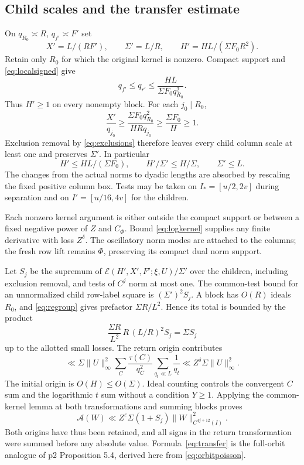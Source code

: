 \documentclass[11pt,a4paper]{article}
\numberwithin{equation}{section}
\theoremstyle{definition}
\theoremstyle{remark}
\newcommand{\eps}{\varepsilon}
\newcommand{\E}{\mathcal E}
\begin{document}
\subsection{Child scales and the transfer estimate}\label{sec:children}
On $q_{R_0}\asymp R$, $q_{f'}\asymp F'$ set
\begin{equation}\label{eq:children}
 X'=L/(RF'),\qquad \Sigma'=L/R,\qquad
 H'=HL/(\Sigma F_0R^2).
\end{equation}
Retain only $R_0$ for which the original kernel is nonzero. Compact support and \eqref{eq:localsigned} give
\[
 q_{f'}\le q_{r'}\le\frac{HL}{\Sigma F_0q_{R_0}^2}.
\]
Thus $H'\ge1$ on every nonempty block. For each $j_0\mid R_0$,
\[
 \frac{X'}{q_{j_0}}
 \ge\frac{\Sigma F_0q_{R_0}^2}{HRq_{j_0}}
 \ge\frac{\Sigma F_0}{H}\ge1.
\]
Exclusion removal by \eqref{eq:exclusions} therefore leaves every child column scale at least one and preserves $\Sigma'$. In particular
\begin{equation}\label{eq:childineq}
 H'\le HL/(\Sigma F_0),\qquad
 H'/\Sigma'\le H/\Sigma,\qquad \Sigma'\le L.
\end{equation}
The changes from the actual norms to dyadic lengths are absorbed by rescaling the fixed positive column box. Tests may be taken on $I_*=[u/2,2v]$ during separation and on $I'=[u/16,4v]$ for the children.

Each nonzero kernel argument is either outside the compact support or between a fixed negative power of $Z$ and $C_\Phi$. Bound \eqref{eq:logkernel} supplies any finite derivative with loss $Z^\delta$. The oscillatory norm modes are attached to the columns; the fresh row lift remains $\Phi$, preserving its compact dual norm support.

Let $S_j$ be the supremum of
$\E(H',X',F';\xi,U)/\Sigma'$
over the children, including exclusion removal, and tests of $C^j$ norm at most one. The common-test bound for an unnormalized child row-label square is $(\Sigma')^2S_j$. A block has $O(R)$ ideals $R_0$, and \eqref{eq:regroup} gives prefactor $\Sigma R/L^2$. Hence its total is bounded by the product
\[
 \frac{\Sigma R}{L^2}\,R\,(L/R)^2S_j=\Sigma S_j
\]
up to the allotted small losses. The return origin contributes
\[
 \ll\Sigma\|U\|_\infty^2
     \sum_C\frac{\tau(C)}{q_C^2}
     \sum_{q_t\ll L}\frac1{q_t}
 \ll Z^\delta\Sigma\|U\|_\infty^2.
\]
The initial origin is $O(H)\le O(\Sigma)$. Ideal counting controls the convergent $C$ sum and the logarithmic $t$ sum without a condition $Y\ge1$. Applying the common-kernel lemma at both transformations and summing blocks proves
\begin{equation}\label{eq:transfer}
 \mathcal A(W)\ll Z^\eps\Sigma(1+S_j)
                               \|W\|_{C^{4j+12}(I)}^2.
\end{equation}
Both origins have thus been retained, and all signs in the return transformation were summed before any absolute value. Formula~\eqref{eq:transfer} is the full-orbit analogue of p2 Proposition 5.4, derived here from \eqref{eq:orbitpoisson}.
\end{document}

